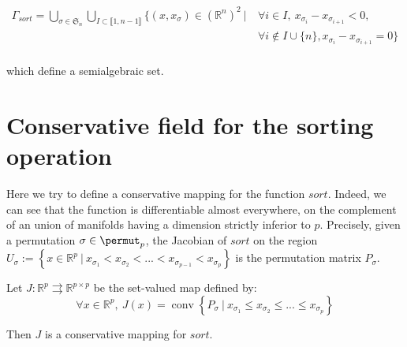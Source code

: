 \documentclass[twoside,11pt]{article}
\newcommand*{\SET}[1]  {\ensuremath{\mathbb{#1}}}
\newcommand{\R}{\SET{R}}
\begin{document}
\begin{align*}
    \Gamma_{sort} = \bigcup_{ \sigma \in \mathfrak{S}_n} \bigcup_{I \subset \llbracket 1, n-1 \rrbracket} \{ (x, x_\sigma) \in (\mathbb{R}^n)^2 \ | \ &\forall i \in I,\: x_{\sigma_i} - x_{\sigma_{i+1}} < 0,\\ &\forall i \notin I\cup\{n\}, x_{\sigma_i} - x_{\sigma_{i+1}} = 0 \} 
\end{align*}
\\
which define a semialgebraic set.

\section{Conservative field for the sorting operation}
Here we try to define a conservative mapping for the function $sort$. Indeed, we can see that the function is differentiable almost everywhere, on the complement of an union of manifolds having a dimension strictly inferior to $p$. Precisely, given a permutation $\sigma \in \permut_p$, the Jacobian of $sort$ on the region $U_\sigma := \left\{x \in \mathbb{R}^p \ | \ x_{\sigma_1} < x_{\sigma_2} < ... < x_{\sigma_{p-1}} < x_{\sigma_p}  \right\}$ is the permutation matrix $P_\sigma$.
\\


\begin{proposition} Let $J : \R^p \rightrightarrows \R^{p \times p}$ be the set-valued map defined by:
\begin{equation}
\forall x \in \R^p,\  J(x) = \operatorname{conv}  \left\{P_\sigma \ | \ x_{\sigma_1} \leq x_{\sigma_2} \leq ... \leq x_{\sigma_p}\right\} 
\end{equation}
\end{proposition}
\noindent
Then $J$ is a conservative mapping for $sort$.
\end{document}
